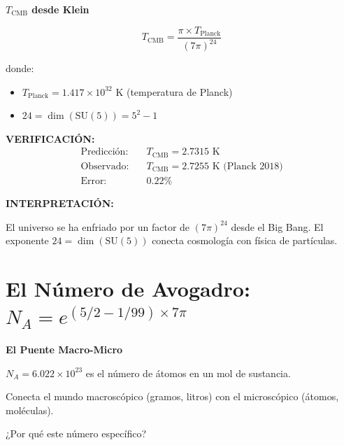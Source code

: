 \begin{nivelmatematico}
\textbf{$T_{\text{CMB}}$ desde Klein}

\begin{equation}
\boxed{T_{\text{CMB}} = \frac{\pi \times T_{\text{Planck}}}{(7\pi)^{24}}}
\end{equation}

donde:
\begin{itemize}
    \item $T_{\text{Planck}} = 1.417 \times 10^{32}$ K (temperatura de Planck)
    \item $24 = \dim(\text{SU}(5)) = 5^2 - 1$
\end{itemize}

\textbf{VERIFICACIÓN:}
\begin{align}
\text{Predicción:} & \quad T_{\text{CMB}} = 2.7315 \text{ K}\\
\text{Observado:} & \quad T_{\text{CMB}} = 2.7255 \text{ K (Planck 2018)}\\
\text{Error:} & \quad 0.22\%
\end{align}

\textbf{INTERPRETACIÓN:}

El universo se ha enfriado por un factor de $(7\pi)^{24}$ desde el Big Bang.
El exponente $24 = \dim(\text{SU}(5))$ conecta cosmología con física de partículas.
\end{nivelmatematico}


\section{El Número de Avogadro: $N_A = e^{(5/2 - 1/99) \times 7\pi}$}

\begin{nivelconceptual}
\textbf{El Puente Macro-Micro}

$N_A = 6.022 \times 10^{23}$ es el número de átomos en un mol de sustancia.

Conecta el mundo macroscópico (gramos, litros) con el microscópico
(átomos, moléculas).

¿Por qué este número específico?
\end{nivelconceptual}

